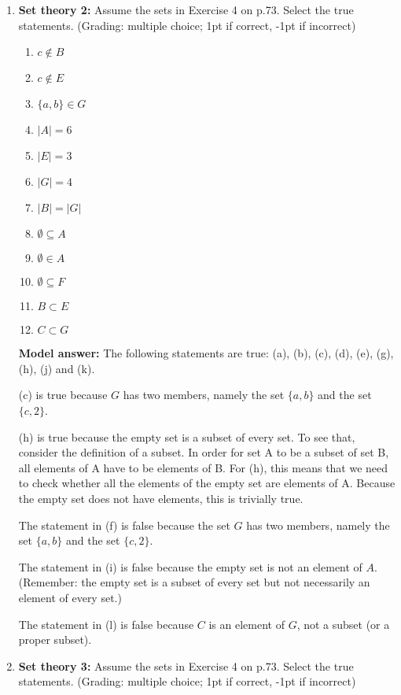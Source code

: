 \documentclass[a4,11pt]{article}
\begin{document}
\begin{enumerate}[leftmargin = 12pt]
\item {\bf Set theory 2:} Assume the sets in Exercise 4 on p.73. Select the true statements. (Grading: multiple choice; 1pt if correct, -1pt if incorrect)

      \begin{enumerate}[noitemsep]
        \item $c \not\in B$
        \item $c \not\in E$
       \item $\{a,b\} \in G$
        \item $|A| = 6$
        \item $|E| = 3$
        \item $|G| = 4$
        \item $|B| = |G|$
	\item $\emptyset \subseteq A$
	\item $\emptyset \in A$
	\item $\emptyset \subseteq F$
	\item $B \subset E$
	\item $C \subset G$
         \end{enumerate}
 
  {\bf Model answer:} The following statements are true: (a), (b), (c), (d), (e), (g), (h), (j) and (k).
  
(c) is true because $G$ has two members, namely the set $\{a,b\}$ and the set $\{c,2\}$.

(h) is true because the empty set is a subset of every set. To see that, consider the definition of a subset. In order for set A to be a subset of set B, all elements of A have to be elements of B. For (h), this means that we need to check whether all the elements of the empty set are elements of A. Because the empty set does not have elements, this is trivially true.
  
The statement in (f) is false because the set $G$ has two members, namely the set $\{a,b\}$ and the set $\{c,2\}$.

The statement in (i) is false because the empty set is not an element of $A$. (Remember: the empty set is a subset of every set but not necessarily an element of every set.)

The statement in (l) is false because $C$ is an element of $G$, not a subset (or a proper subset).

        
\item {\bf Set theory 3:} Assume the sets in Exercise 4 on p.73. Select the true statements. (Grading: multiple choice; 1pt if correct, -1pt if incorrect)


\end{enumerate}
\end{document}
